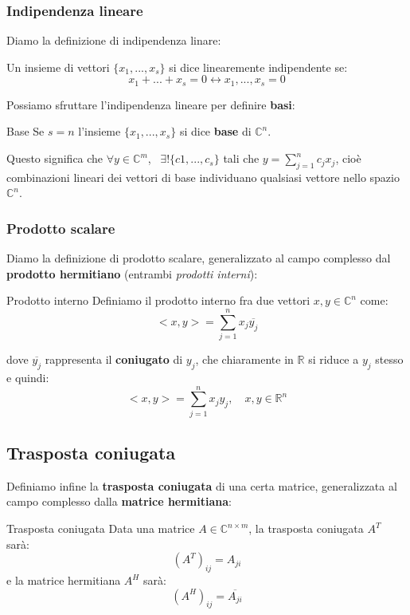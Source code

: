 \documentclass[a4paper,11pt]{article}
\begin{document}
\subsubsection{Indipendenza lineare}
Diamo la definizione di indipendenza linare:
\begin{definition}{}
	Un insieme di vettori $\{x_1, ..., x_s\}$ si dice linearemente indipendente se:
	$$
		x_1 + ... + x_s = 0 \leftrightarrow x_1, ..., x_s = 0
	$$
\end{definition}

Possiamo sfruttare l'indipendenza lineare per definire \textbf{basi}:
\begin{definition}{Base}
	Se $s = n$ l'insieme $\{ x_1, ...,x_s \}$ si dice \textbf{base} di $\mathbb{C}^n$.
\end{definition}

Questo significa che $\forall y \in \mathbb{C}^m$, \ $\exists ! \{c1, ..., c_s\}$ tali che $y = \sum_{j=1}^n c_j x_j$, cioè combinazioni lineari dei vettori di base individuano qualsiasi vettore nello spazio $\mathbb{C}^n$.

\subsubsection{Prodotto scalare}
Diamo la definizione di prodotto scalare, generalizzato al campo complesso dal \textbf{prodotto hermitiano} (entrambi \textit{prodotti interni}):
\begin{definition}{Prodotto interno}
	Definiamo il prodotto interno fra due vettori $x, y \in \mathbb{C}^n$ come:
	$$
	<x, y> = \sum_{j = 1}^n x_j \overline{y_j}
	$$
\end{definition}
dove $\overline{y_j}$ rappresenta il \textbf{coniugato} di $y_j$, che chiaramente in $\mathbb{R}$ si riduce a $y_j$ stesso e quindi:
	$$
	<x, y> = \sum_{j = 1}^n x_j y_j, \quad x, y \in \mathbb{R}^n
	$$ 

\subsection{Trasposta coniugata}
Definiamo infine la \textbf{trasposta coniugata} di una certa matrice, generalizzata al campo complesso dalla \textbf{matrice hermitiana}:
\begin{definition}{Trasposta coniugata}
	Data una matrice $A \in \mathbb{C}^{n \times m}$, la trasposta coniugata $A^T$ sarà:
	$$
		(A^T)_{ij} = A_{ji}
	$$
	e la matrice hermitiana $A^H$ sarà: 
	$$
		(A^H)_{ij} = \overline{A_{ji}}
	$$
\end{definition}
\end{document}
